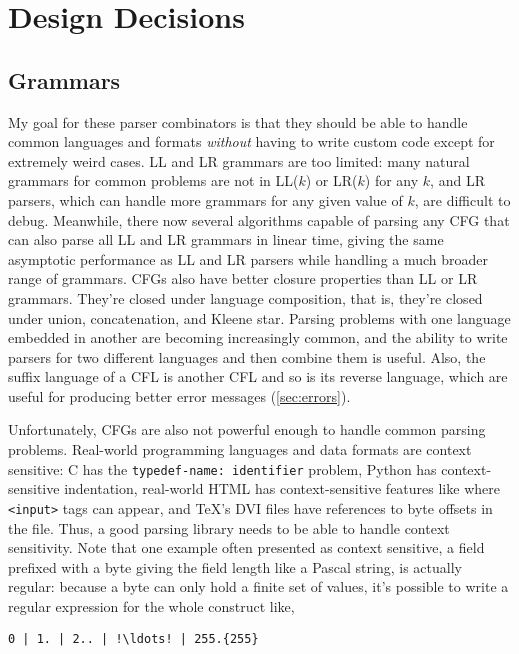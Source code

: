 \documentclass[12pt]{article}
\begin{document}
\section{Design Decisions}
\label{sec:design_decisions}


\subsection{Grammars}
\label{sec:grammar}

My goal for these parser combinators is that they should be able to
handle common languages and formats \emph{without} having to write
custom code except for extremely weird cases.  LL and LR grammars are
too limited: many natural grammars for common problems are not in
LL($k$) or LR($k$) for any $k$, and LR parsers, which can handle more
grammars for any given value of $k$, are difficult to debug.
Meanwhile, there now several algorithms capable of parsing any CFG
that can also parse all LL and LR grammars in linear time, giving the
same asymptotic performance as LL and LR parsers while handling a much
broader range of grammars.  CFGs also have better closure properties
than LL or LR grammars.  They're closed under language composition,
that is, they're closed under union, concatenation, and Kleene star.
Parsing problems with one language embedded in another are becoming
increasingly common, and the ability to write parsers for two
different languages and then combine them is useful.  Also, the suffix
language of a CFL is another CFL \parencite[p. 401]{grune_jacobs} and
so is its reverse language, which are useful for producing better
error messages (\ref{sec:errors}).

Unfortunately, CFGs are also not powerful enough to handle common
parsing problems.  Real-world programming languages and data formats
are context sensitive: C has the \texttt{typedef-name: identifier}
problem, Python has context-sensitive indentation, real-world HTML has
context-sensitive features like where \texttt{<input>} tags can
appear, and \TeX's DVI files have references to byte offsets in the
file.  Thus, a good parsing library needs to be able to handle context
sensitivity.  Note that one example often presented as context
sensitive, a field prefixed with a byte giving the field length like a
Pascal string, is actually regular: because a byte can only hold a
finite set of values, it's possible to write a regular expression for
the whole construct like,

\begin{lstlisting}
0 | 1. | 2.. | !\ldots! | 255.{255}
\end{lstlisting}
\end{document}
